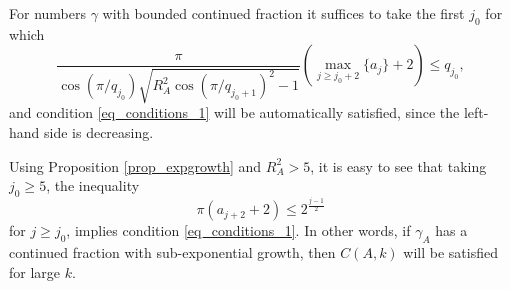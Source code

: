 \documentclass{amsart}
\begin{document}
For numbers $\gamma$ with bounded continued fraction it suffices to take the first $j_0$ for which
\begin{equation}
	\label{eq_firstj0}
	\frac{\pi}{\cos(\pi / q_{j_0}) \sqrt{R_A^2 \cos(\pi / q_{j_0+1})^2 - 1}} \left(\max_{j \geq j_0+2}\{a_j\}+2\right) \leq q_{j_0},
\end{equation}
and condition \eqref{eq_conditions_1} will be automatically satisfied, since the left-hand side is decreasing.

Using Proposition \ref{prop_expgrowth} and $R_A^2>5$, it is easy to see that taking $j_0 \geq 5$, the inequality
\begin{equation}
	\label{eq_simple_condition}
	\pi (a_{j+2}+2) \leq 2^{\frac{j-1}2}
\end{equation}
for $j \geq j_0$, implies condition \eqref{eq_conditions_1}.
In other words, if $\gamma_A$ has a continued fraction with sub-exponential growth, then $C(A,k)$ will be satisfied for large $k$.
\end{document}

